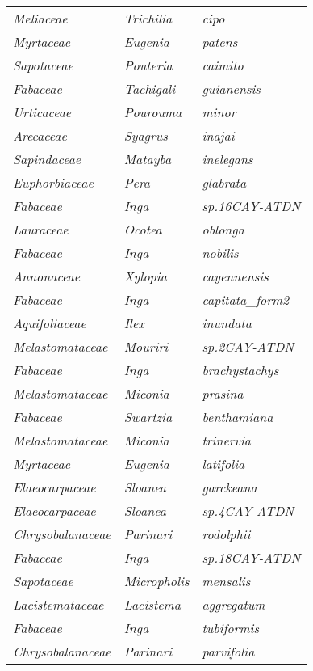 \documentclass[fleqn,10pt]{ArtEcoFoG} %
\renewenvironment{table}{\begin{table*}}{\end{table*}\ignorespacesafterend}
\begin{document}
\begin{table}
\begin{tabular}[t]{lll}
\addlinespace
\em{Meliaceae} & \em{Trichilia} & \em{cipo}\\
\em{Myrtaceae} & \em{Eugenia} & \em{patens}\\
\em{Sapotaceae} & \em{Pouteria} & \em{caimito}\\
\em{Fabaceae} & \em{Tachigali} & \em{guianensis}\\
\em{Urticaceae} & \em{Pourouma} & \em{minor}\\
\addlinespace
\em{Arecaceae} & \em{Syagrus} & \em{inajai}\\
\em{Sapindaceae} & \em{Matayba} & \em{inelegans}\\
\em{Euphorbiaceae} & \em{Pera} & \em{glabrata}\\
\em{Fabaceae} & \em{Inga} & \em{sp.16CAY-ATDN}\\
\em{Lauraceae} & \em{Ocotea} & \em{oblonga}\\
\addlinespace
\em{Fabaceae} & \em{Inga} & \em{nobilis}\\
\em{Annonaceae} & \em{Xylopia} & \em{cayennensis}\\
\em{Fabaceae} & \em{Inga} & \em{capitata\_form2}\\
\em{Aquifoliaceae} & \em{Ilex} & \em{inundata}\\
\em{Melastomataceae} & \em{Mouriri} & \em{sp.2CAY-ATDN}\\
\addlinespace
\em{Fabaceae} & \em{Inga} & \em{brachystachys}\\
\em{Melastomataceae} & \em{Miconia} & \em{prasina}\\
\em{Fabaceae} & \em{Swartzia} & \em{benthamiana}\\
\em{Melastomataceae} & \em{Miconia} & \em{trinervia}\\
\em{Myrtaceae} & \em{Eugenia} & \em{latifolia}\\
\addlinespace
\em{Elaeocarpaceae} & \em{Sloanea} & \em{garckeana}\\
\em{Elaeocarpaceae} & \em{Sloanea} & \em{sp.4CAY-ATDN}\\
\em{Chrysobalanaceae} & \em{Parinari} & \em{rodolphii}\\
\em{Fabaceae} & \em{Inga} & \em{sp.18CAY-ATDN}\\
\em{Sapotaceae} & \em{Micropholis} & \em{mensalis}\\
\addlinespace
\em{Lacistemataceae} & \em{Lacistema} & \em{aggregatum}\\
\em{Fabaceae} & \em{Inga} & \em{tubiformis}\\
\em{Chrysobalanaceae} & \em{Parinari} & \em{parvifolia}\\

\end{tabular}
\end{table}
\end{document}
